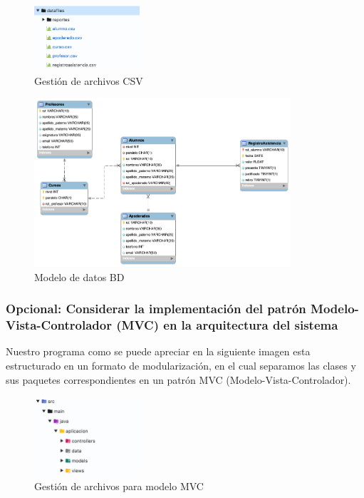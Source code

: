 \begin{figure}[h]
    \centering
    \includegraphics[width=0.35\textwidth]{contents/img/img12}
    \caption{Gestión de archivos CSV}
    \label{fig:img12}
\end{figure}

\begin{figure}[h]
    \centering
    \includegraphics[width=0.85\textwidth]{contents/img/img13}
    \caption{Modelo de datos BD}
    \label{fig:img13}
\end{figure}

\clearpage

\subsubsection*{Opcional: Considerar la implementación del patrón Modelo-Vista-Controlador (MVC) en la arquitectura del sistema}

Nuestro programa como se puede apreciar en la siguiente imagen  esta estructurado en un formato de modularización, en el cual separamos las clases y sus paquetes correspondientes  en un patrón MVC (Modelo-Vista-Controlador).

\begin{figure}[h]
    \centering
    \includegraphics[width=0.35\textwidth]{contents/img/img14}
    \caption{Gestión de archivos para modelo MVC}
    \label{fig:img14}
\end{figure}
